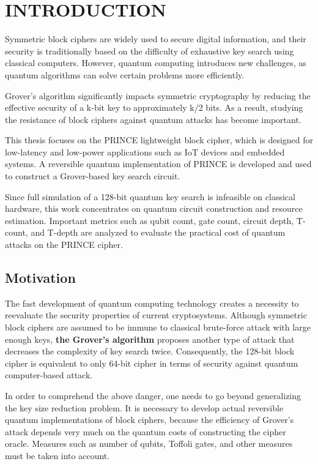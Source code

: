\documentclass[12pt,a4paper]{report}
\begin{document}

\cleardoublepage
{}
\setcounter{page}{1}
\onehalfspacing
\chapter{INTRODUCTION}

Symmetric block ciphers are widely used to secure digital information, and their security is traditionally based on the difficulty of exhaustive key search using classical computers. However, quantum computing introduces new challenges, as quantum algorithms can solve certain problems more efficiently.

Grover’s algorithm significantly impacts symmetric cryptography by reducing the effective security of a k-bit key to approximately k/2 bits. As a result, studying the resistance of block ciphers against quantum attacks has become important.

This thesis focuses on the PRINCE lightweight block cipher, which is designed for low-latency and low-power applications such as IoT devices and embedded systems. A reversible quantum implementation of PRINCE is developed and used to construct a Grover-based key search circuit.

Since full simulation of a 128-bit quantum key search is infeasible on classical hardware, this work concentrates on quantum circuit construction and resource estimation. Important metrics such as qubit count, gate count, circuit depth, T-count, and T-depth are analyzed to evaluate the practical cost of quantum attacks on the PRINCE cipher.

\section{Motivation}

The fast development of quantum computing technology creates a necessity to reevaluate the security properties of current cryptosystems. Although symmetric block ciphers are assumed to be immune to classical brute-force attack with large enough keys, \textbf{the Grover's algorithm} proposes another type of attack that decreases the complexity of key search twice. Consequently, the 128-bit block cipher is equivalent to only 64-bit cipher in terms of security against quantum computer-based attack.

In order to comprehend the above danger, one needs to go beyond generalizing the key size reduction problem. It is necessary to develop actual reversible quantum implementations of block ciphers, because the efficiency of Grover's attack depends very much on the quantum costs of constructing the cipher oracle. Measures such as number of qubits, Toffoli gates, and other measures must be taken into account.
\end{document}
